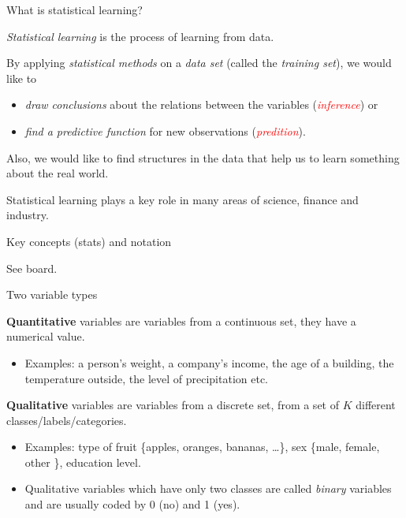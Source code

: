 \documentclass[ignorenonframetext,]{beamer}
\providecommand{\tightlist}{%
  \setlength{\itemsep}{0pt}\setlength{\parskip}{0pt}}
\begin{document}
\begin{frame}{What is statistical learning?}

\emph{Statistical learning} is the process of learning from data.

By applying \emph{statistical methods} on a \emph{data set} (called the
\emph{training set}), we would like to

\begin{itemize}
\tightlist
\item
  \emph{draw conclusions} about the relations between the variables
  (\emph{\textcolor{red}{inference}}) or
\item
  \emph{find a predictive function} for new observations
  (\emph{\textcolor{red}{predition}}).
\end{itemize}

Also, we would like to find structures in the data that help us to learn
something about the real world.

Statistical learning plays a key role in many areas of science, finance
and industry.

\end{frame}

\begin{frame}{Key concepts (stats) and notation}

See board.

\end{frame}

\begin{frame}

\begin{block}{Two variable types}

\vspace{2mm}

\textbf{Quantitative} variables are variables from a continuous set,
they have a numerical value.

\begin{itemize}
\tightlist
\item
  Examples: a person's weight, a company's income, the age of a
  building, the temperature outside, the level of precipitation etc.
\end{itemize}

\vspace{2mm}

\textbf{Qualitative} variables are variables from a discrete set, from a
set of \(K\) different classes/labels/categories.

\begin{itemize}
\item
  Examples: type of fruit \{apples, oranges, bananas, \ldots{}\}, sex
  \{male, female, other \}, education level.
\item
  Qualitative variables which have only two classes are called
  \emph{binary} variables and are usually coded by 0 (no) and 1 (yes).
\end{itemize}

\end{block}

\end{frame}
\end{document}
